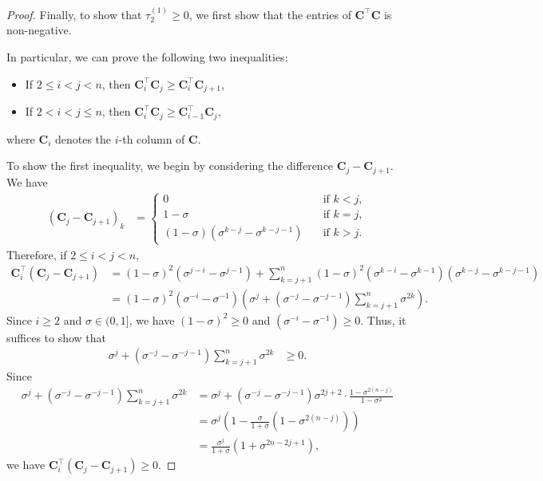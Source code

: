 \documentclass[10pt,a4paper]{amsart}
\def\bigopen#1{\left(#1\right)}
\def\mC{{\bm{C}}}
\begin{document}
\begin{proof}
    Finally, to show that $\tau_2^{(1)}\ge 0$, we first show that the entries of $\mC^{\top} \mC$ is non-negative.
    
    In particular, we can prove the following two inequalities:
    \begin{itemize}
        \item If $2 \le i < j < n$, then $\mC_i^{\top} \mC_j \ge \mC_i^{\top} \mC_{j+1}$,
        \item If $2 < i < j \le n$, then $\mC_i^{\top} \mC_j \ge \mC_{i-1}^{\top} \mC_j$,
    \end{itemize}
    where $\mC_i$ denotes the $i$-th column of $\mC$.
    
    To show the first inequality, we begin by considering the difference $\mC_j - \mC_{j+1}$.
    We have
    \begin{align}
        (\mC_j - \mC_{j+1})_k &= 
        \begin{cases}
            0 &\quad \text{if } k < j, \\
            1-\sigma &\quad \text{if } k = j, \\
            (1-\sigma)(\sigma^{k-j} - \sigma^{k-j-1}) &\quad \text{if } k > j.
        \end{cases}
    \label{eq:cjdiff}
    \end{align}
    Therefore, if $2 \le i < j < n$, 
    \begin{align*}
        \mC_i^{\top} (\mC_j - \mC_{j+1}) &= (1-\sigma)^2(\sigma^{j-i} - \sigma^{j-1}) + \sum_{k=j+1}^n (1-\sigma)^2(\sigma^{k-i} - \sigma^{k-1})(\sigma^{k-j} - \sigma^{k-j-1})\\
        &= (1-\sigma)^2(\sigma^{-i} - \sigma^{-1}) \bigopen{\sigma^j +(\sigma^{-j} - \sigma^{-j-1})\sum_{k=j+1}^n \sigma^{2k}}.
    \end{align*}
    Since $i \ge 2$ and $\sigma\in (0, 1]$, we have $(1-\sigma)^2 \ge 0$ and $(\sigma^{-i}-\sigma^{-1}) \ge 0$. 
    Thus, it suffices to show that 
    \begin{align*}
        \sigma^j +(\sigma^{-j} - \sigma^{-j-1})\sum_{k=j+1}^n \sigma^{2k} &\ge 0.
    \end{align*}
    Since 
    \begin{align*}
        \sigma^j +(\sigma^{-j} - \sigma^{-j-1})\sum_{k=j+1}^n \sigma^{2k} &= \sigma^j +(\sigma^{-j} - \sigma^{-j-1}) \sigma^{2j+2} \cdot \frac{1-\sigma^{2(n-j)}}{1-\sigma^2} \\
        &= \sigma^j \bigopen{1 - \frac{\sigma}{1+\sigma}(1-\sigma^{2(n-j)})}\\
        &= \frac{\sigma^j}{1+\sigma} (1+\sigma^{2n-2j+1}),
    \end{align*}
    we have $\mC_i^{\top} (\mC_j - \mC_{j+1}) \ge 0$.


\end{proof}
\end{document}

